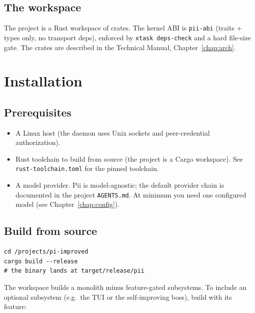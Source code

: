 \documentclass[
	fontsize=10pt,
	twoside=false,
	secnumdepth=2,
	open=any,
]{kaobook}
\begin{document}
\section{The workspace}

The project is a Rust workspace of crates. The kernel ABI is
\texttt{pii-abi} (traits + types only, no transport deps), enforced by
\texttt{xtask deps-check} and a hard file-size gate. The crates are
described in the Technical Manual, Chapter~\ref{chap:arch}.

\chapter{Installation}
\label{chap:install}

\section{Prerequisites}

\begin{itemize}
    \item A Linux host (the daemon uses Unix sockets and peer-credential
        authorization).
    \item Rust toolchain to build from source (the project is a Cargo
        workspace). See \texttt{rust-toolchain.toml} for the pinned
        toolchain.
    \item A model provider. Pii is model-agnostic; the default provider
        chain is documented in the project \texttt{AGENTS.md}. At minimum
        you need one configured model (see Chapter~\ref{chap:config}).
\end{itemize}

\section{Build from source}

\begin{cmdbox}[Build]
\begin{lstlisting}
cd /projects/pi-improved
cargo build --release
# the binary lands at target/release/pii
\end{lstlisting}
\end{cmdbox}

The workspace builds a monolith minus feature-gated subsystems. To include
an optional subsystem (e.g.\ the TUI or the self-improving boss), build
with its feature:
\end{document}
